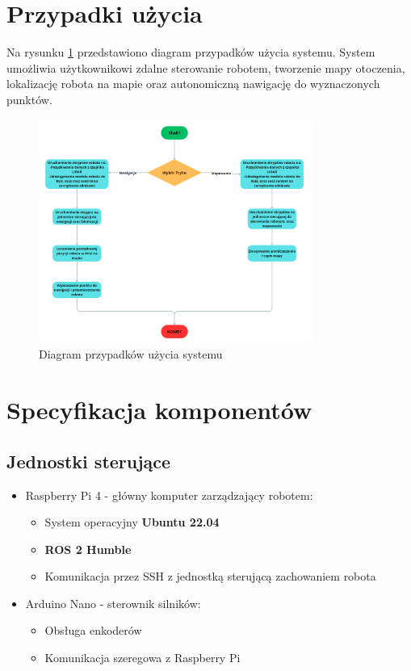\documentclass[a4paper,twoside,12pt]{book}
\begin{document}
\section{Przypadki użycia}
Na rysunku \ref{fig:use-case} przedstawiono diagram przypadków użycia systemu. System umożliwia użytkownikowi zdalne sterowanie robotem, tworzenie mapy otoczenia, lokalizację robota na mapie oraz autonomiczną nawigację do wyznaczonych punktów. 
\begin{figure}[!hb]
\centering
\includegraphics[width=0.8\textwidth]{images/UML.png}
\caption{Diagram przypadków użycia systemu}
\label{fig:use-case}
\end{figure}
\newpage
\section{Specyfikacja komponentów}
\subsection{Jednostki sterujące}
\begin{itemize}
\item Raspberry Pi 4 - główny komputer zarządzający robotem:
	\begin{itemize}
	\item System operacyjny \textbf{Ubuntu 22.04}
	\item \textbf{ROS 2 Humble}  
	\item Komunikacja przez SSH z jednostką sterującą zachowaniem robota
	\end{itemize}
	
		
\item Arduino Nano - sterownik silników:
	\begin{itemize}
	\item Obsługa enkoderów
	\item Komunikacja szeregowa z Raspberry Pi
	\end{itemize}


\end{itemize}
\end{document}
